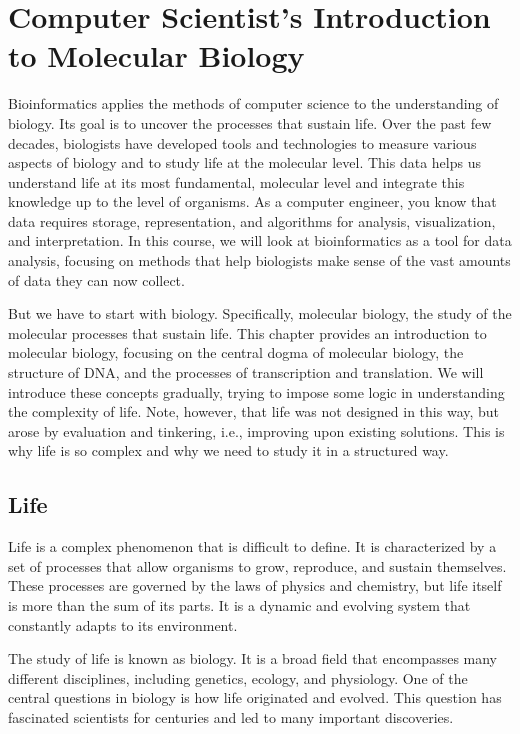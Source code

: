 \chapter{Computer Scientist's Introduction to Molecular Biology}
\label{ch:intro-mol-biol}

Bioinformatics applies the methods of computer science to the understanding of biology. Its goal is to uncover the processes that sustain life. Over the past few decades, biologists have developed tools and technologies to measure various aspects of biology and to study life at the molecular level. This data helps us understand life at its most fundamental, molecular level and integrate this knowledge up to the level of organisms. As a computer engineer, you know that data requires storage, representation, and algorithms for analysis, visualization, and interpretation. In this course, we will look at bioinformatics as a tool for data analysis, focusing on methods that help biologists make sense of the vast amounts of data they can now collect.

But we have to start with biology. Specifically, molecular biology, the study of the molecular processes that sustain life. This chapter provides an introduction to molecular biology, focusing on the central dogma of molecular biology, the structure of DNA, and the processes of transcription and translation. We will introduce these concepts gradually, trying to impose some logic in understanding the complexity of life. Note, however, that life was not designed in this way, but arose by evaluation and tinkering, i.e., improving upon existing solutions. This is why life is so complex and why we need to study it in a structured way.

\section{Life}

Life is a complex phenomenon that is difficult to define. It is characterized by a set of processes that allow organisms to grow, reproduce, and sustain themselves. These processes are governed by the laws of physics and chemistry, but life itself is more than the sum of its parts. It is a dynamic and evolving system that constantly adapts to its environment.

The study of life is known as biology. It is a broad field that encompasses many different disciplines, including genetics, ecology, and physiology. One of the central questions in biology is how life originated and evolved. This question has fascinated scientists for centuries and led to many important discoveries.

